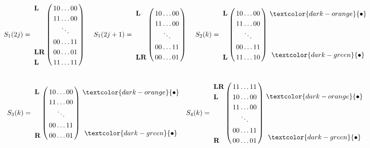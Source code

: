 \documentclass[12pt]{book}
\theoremstyle{plain}
\theoremstyle{remark}
\begin{document}
\begin{figure}[H]
	\centering
	\small{
			\begin{align*}
			S_1(2j) &= \bordermatrix{ & \cr
				\textbf{L}& 1 0 \ldots 00  \cr
							  & 1 1 \ldots 00 \cr
						       &   \ddots  \cr
						       & 0 0 \ldots 11 \cr
				\textbf{LR} &0 0  \ldots 01 \cr
				\textbf{L} & 1  1  \ldots  11 }\
			&
			S_1(2j+1) &=  \bordermatrix{ & \cr
				\textbf{L} & 1 0 \ldots 0 0 \cr
							& 1 1 \ldots 0 0 \cr
							& \ddots \cr
							& 0 0 \ldots 1 1 \cr
				\textbf{LR} &0 0 \ldots 0 1 }\
			&
		S_2(k) &= \bordermatrix{ & \cr
				\textbf{L}& 1 0 \ldots 0 0 \cr
							& 1 1  \ldots 0 0 \cr
							&  \ddots \cr
					 	    &0 0 \ldots 1 1 \cr
				\textbf{L} & 1 1 \ldots 1 0 }\
				\begin{matrix}
			 \textcolor{dark-orange}{\bullet} \\ \\ \\ \\ \\ \textcolor{dark-green}{\bullet} \\
				\end{matrix}
				\end{align*}
				\begin{align*}
			S_3(k) &=  \bordermatrix{ & \cr
				\textbf{L} & 1 0 \ldots 0 0 \cr
							& 1 1  \ldots 0 0 \cr
							&  \ddots \cr
							&0 0 \ldots 1 1 \cr
				\textbf{R} & 0 0 \ldots 0 1 }\
				\begin{matrix}
			\textcolor{dark-orange}{\bullet} \\ \\ \\ \\ \\ \textcolor{dark-green}{\bullet} \\
				\end{matrix}
			&
		S_4(k) &= \bordermatrix{ & \cr
		\textbf{LR}& 1 1 \ldots 1 1 \cr
		\textbf{L} & 1 0 \ldots 0 0 \cr
						& 1 1  \ldots  0 0 \cr
						&  \ddots \cr
						& 0 0  \ldots 1 1 \cr
		  \textbf{R}& 0 0 \ldots 0 1  }\
				\begin{matrix}
			\\ \textcolor{dark-orange}{\bullet} \\ \\ \\ \\ \\ \textcolor{dark-green}{\bullet} \\
				\end{matrix}

\end{align*}}
\end{figure}
\end{document}
